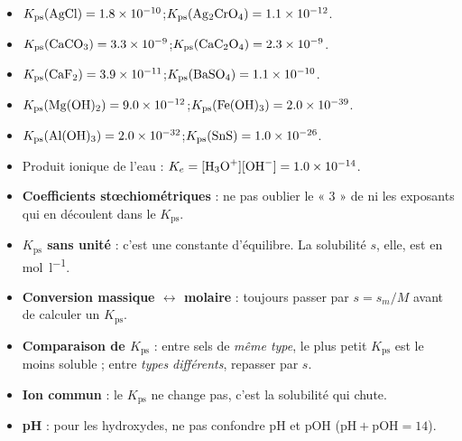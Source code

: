 \documentclass[11pt,a4paper]{article}
\newcommand{\Kps}{K_{\mathrm{ps}}}
\begin{document}
\begin{tcolorbox}[boxbase,colback=primary!6,colframe=primary,
   title={\textsc{Mémo — valeurs de référence (\qty{25}{\degreeCelsius})}}]
\begin{itemize}[leftmargin=1.6em,topsep=2pt,itemsep=2pt]
  \item $\Kps(\ce{AgCl})=\num{1{,}8e-10}$\quad;\quad $\Kps(\ce{Ag2CrO4})=\num{1{,}1e-12}$.
  \item $\Kps(\ce{CaCO3})=\num{3{,}3e-9}$\quad;\quad $\Kps(\ce{CaC2O4})=\num{2{,}3e-9}$.
  \item $\Kps(\ce{CaF2})=\num{3{,}9e-11}$\quad;\quad $\Kps(\ce{BaSO4})=\num{1{,}1e-10}$.
  \item $\Kps(\ce{Mg(OH)2})=\num{9{,}0e-12}$\quad;\quad $\Kps(\ce{Fe(OH)3})=\num{2{,}0e-39}$.
  \item $\Kps(\ce{Al(OH)3})=\num{2{,}0e-32}$\quad;\quad $\Kps(\ce{SnS})=\num{1{,}0e-26}$.
  \item Produit ionique de l'eau : $K_{e}=[\ce{H3O+}][\ce{OH-}]=\num{1{,}0e-14}$.
\end{itemize}
\end{tcolorbox}

\begin{tcolorbox}[boxbase,colback=attncol!6,colframe=attncol,
   title={\textsc{Mémo — les pièges classiques à éviter}}]
\begin{itemize}[leftmargin=1.6em,topsep=2pt,itemsep=1.5pt]
  \item \textbf{Coefficients stœchiométriques} : ne pas oublier le « $3$ » de  ni les
        exposants qui en découlent dans le $\Kps$.
  \item \textbf{$\Kps$ sans unité} : c'est une constante d'équilibre. La solubilité $s$, elle, est en
        \si{\mole\per\litre}.
  \item \textbf{Conversion massique $\leftrightarrow$ molaire} : toujours passer par $s=s_m/M$ avant
        de calculer un $\Kps$.
  \item \textbf{Comparaison de $\Kps$} : entre sels de \emph{même type}, le plus petit $\Kps$ est le
        moins soluble ; entre \emph{types différents}, repasser par $s$.
  \item \textbf{Ion commun} : le $\Kps$ ne change pas, c'est la solubilité qui chute.
  \item \textbf{pH} : pour les hydroxydes, ne pas confondre $\mathrm{pH}$ et $\mathrm{pOH}$
        ($\mathrm{pH}+\mathrm{pOH}=14$).
\end{itemize}
\end{tcolorbox}
\end{document}
